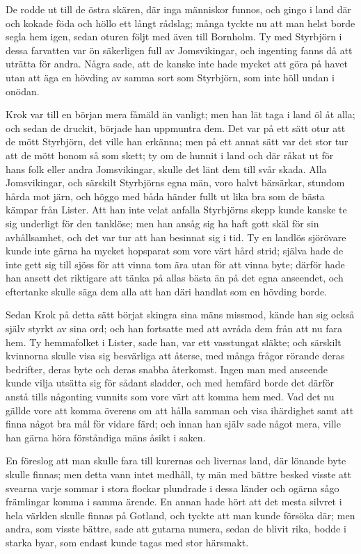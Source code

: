 \initial De rodde ut till de östra skären, där inga människor funnos, och gingo i land där och kokade föda och höllo ett långt rådslag; många tyckte nu att man helst borde segla hem igen, sedan oturen följt med även till Bornholm. Ty med Styrbjörn i dessa farvatten var ön säkerligen full av Jomsvikingar, och ingenting fanns då att uträtta för andra. Några sade, att de kanske inte hade mycket att göra på havet utan att äga en hövding av samma sort som Styrbjörn, som inte höll undan i onödan.

\initial Krok var till en början mera fåmäld än vanligt; men han lät taga i land öl åt alla; och sedan de druckit, började han uppmuntra dem. Det var på ett sätt otur att de mött Styrbjörn, det ville han erkänna; men på ett annat sätt var det stor tur att de mött honom så som skett; ty om de hunnit i land och där råkat ut för hans folk eller andra Jomsvikingar, skulle det länt dem till svår skada. Alla Jomsvikingar, och särskilt Styrbjörns egna män, voro halvt bärsärkar, stundom hårda mot järn, och höggo med båda händer fullt ut lika bra som de bästa kämpar från Lister. Att han inte velat anfalla Styrbjörns skepp kunde kanske te sig underligt för den tanklöse; men han ansåg sig ha haft gott skäl för sin avhållsamhet, och det var tur att han besinnat sig i tid. Ty en landlös sjörövare kunde inte gärna ha mycket hopsparat som vore värt hård strid; själva hade de inte gett sig till sjöss för att vinna tom ära utan för att vinna byte; därför hade han ansett det riktigare att tänka på allas bästa än på det egna anseendet, och eftertanke skulle säga dem alla att han däri handlat som en hövding borde.

\initial Sedan Krok på detta sätt börjat skingra sina mäns missmod, kände han sig också själv styrkt av sina ord; och han fortsatte med att avråda dem från att nu fara hem. Ty hemmafolket i Lister, sade han, var ett vasstungat släkte; och särskilt kvinnorna skulle visa sig besvärliga att återse, med många frågor rörande deras bedrifter, deras byte och deras snabba återkomst. Ingen man med anseende kunde vilja utsätta sig för sådant sladder, och med hemfärd borde det därför anstå tills någonting vunnits som vore värt att komma hem med. Vad det nu gällde vore att komma överens om att hålla samman och visa ihärdighet samt att finna något bra mål för vidare färd; och innan han själv sade något mera, ville han gärna höra förståndiga mäns åsikt i saken.

\initial En föreslog att man skulle fara till kurernas och livernas land, där lönande byte skulle finnas; men detta vann intet medhåll, ty män med bättre besked visste att svearna varje sommar i stora flockar plundrade i dessa länder och ogärna sågo främlingar komma i samma ärende. En annan hade hört att det mesta silvret i hela världen skulle finnas på Gotland, och tyckte att man kunde försöka där; men andra, som visste bättre, sade att gutarna numera, sedan de blivit rika, bodde i starka byar, som endast kunde tagas med stor härsmakt.

